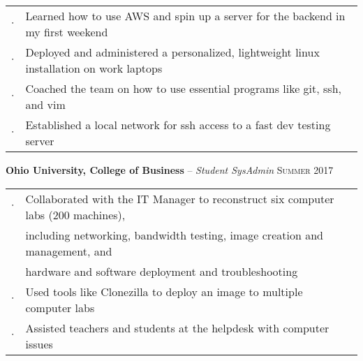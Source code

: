 \documentclass[letterpaper,12pt]{article}
\begin{document}
\begin{tabular}{rl}
$\cdot$ & Learned how to use AWS and spin up a server for the backend in my first weekend \\
$\cdot$ & Deployed and administered a personalized, lightweight linux installation on work laptops \\
$\cdot$ & Coached the team on how to use essential programs like git, ssh, and vim \\
$\cdot$ & Established a local network for ssh access to a fast dev testing server \\
\end{tabular}

\textbf{Ohio University, College of Business} -- \textit{Student SysAdmin} \hfill \textsc{Summer 2017}

\begin{tabular}{rl}
$\cdot$ & Collaborated with the IT Manager to reconstruct six computer labs (200 machines), \\
        & including networking, bandwidth testing, image creation and management, and \\
        & hardware and software deployment and troubleshooting \\
$\cdot$ & Used tools like Clonezilla to deploy an image to multiple computer labs \\
$\cdot$ & Assisted teachers and students at the helpdesk with computer issues \\
\end{tabular}

%
\end{document}
